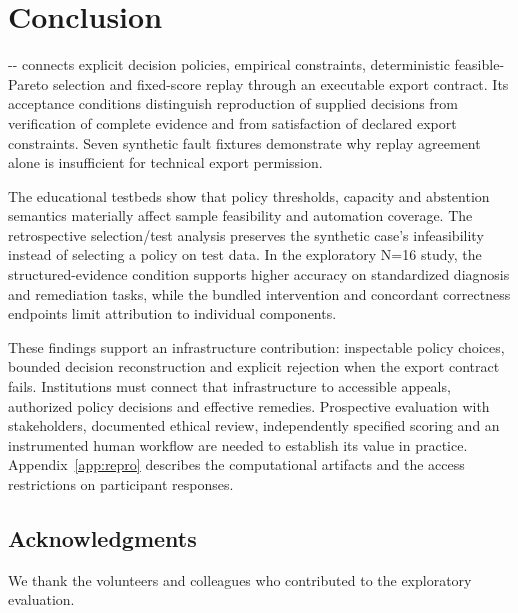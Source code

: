 \section{Conclusion}
\label{sec:conclusion}
\compa-\ecl-\mas{} connects explicit decision policies, empirical constraints, deterministic feasible-Pareto selection and fixed-score replay through an executable export contract. Its acceptance conditions distinguish reproduction of supplied decisions from verification of complete evidence and from satisfaction of declared export constraints. Seven synthetic fault fixtures demonstrate why replay agreement alone is insufficient for technical export permission.

The educational testbeds show that policy thresholds, capacity and abstention semantics materially affect sample feasibility and automation coverage. The retrospective selection/test analysis preserves the synthetic case's infeasibility instead of selecting a policy on test data. In the exploratory N=16 study, the structured-evidence condition supports higher accuracy on standardized diagnosis and remediation tasks, while the bundled intervention and concordant correctness endpoints limit attribution to individual components.

These findings support an infrastructure contribution: inspectable policy choices, bounded decision reconstruction and explicit rejection when the export contract fails. Institutions must connect that infrastructure to accessible appeals, authorized policy decisions and effective remedies. Prospective evaluation with stakeholders, documented ethical review, independently specified scoring and an instrumented human workflow are needed to establish its value in practice. Appendix~\ref{app:repro} describes the computational artifacts and the access restrictions on participant responses.

\subsection*{Acknowledgments}
We thank the volunteers and colleagues who contributed to the exploratory evaluation.

